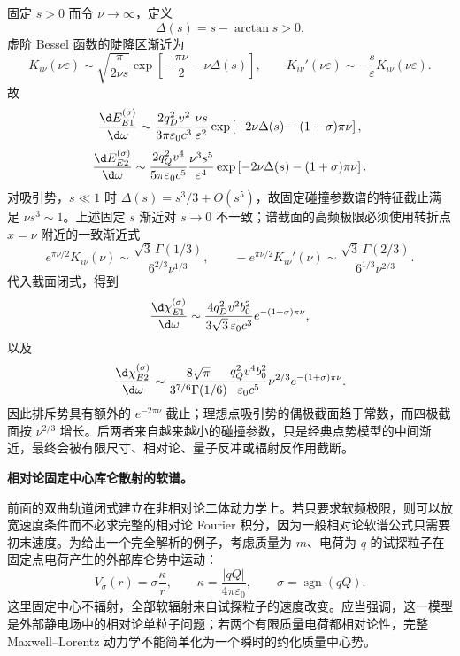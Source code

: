 固定 $s>0$ 而令 $\nu\to\infty$，定义
\begin{equation*}
	\Delta(s)=s-\arctan s>0.
\end{equation*}
虚阶 Bessel 函数的陡降区渐近为
\begin{equation*}
	K_{i\nu}(\nu\varepsilon)
	\sim\sqrt{\frac{\pi}{2\nu s}}
	\exp\left[-\frac{\pi\nu}{2}-\nu\Delta(s)\right],
	\qquad
	K_{i\nu}'(\nu\varepsilon)
	\sim-\frac{s}{\varepsilon}K_{i\nu}(\nu\varepsilon).
\end{equation*}
故
\begin{equation*}
	\frac{\d E_{E1}^{(\sigma)}}{\d\omega}
	\sim
	\frac{2q_D^2v^2}{3\pi\varepsilon_0c^3}
	\frac{\nu s}{\varepsilon^2}
	\exp\left[-2\nu\Delta(s)-(1+\sigma)\pi\nu\right],
\end{equation*}
\begin{equation*}
	\frac{\d E_{E2}^{(\sigma)}}{\d\omega}
	\sim
	\frac{2q_Q^2v^4}{5\pi\varepsilon_0c^5}
	\frac{\nu^3s^5}{\varepsilon^4}
	\exp\left[-2\nu\Delta(s)-(1+\sigma)\pi\nu\right].
\end{equation*}
对吸引势，$s\ll1$ 时 $\Delta(s)=s^3/3+O(s^5)$，故固定碰撞参数谱的特征截止满足 $\nu s^3\sim1$。上述固定 $s$ 渐近对 $s\to0$ 不一致；谱截面的高频极限必须使用转折点 $x=\nu$ 附近的一致渐近式
\begin{equation*}
	e^{\pi\nu/2}K_{i\nu}(\nu)
	\sim\frac{\sqrt3\,\Gamma(1/3)}{6^{2/3}\nu^{1/3}},
	\qquad
	-e^{\pi\nu/2}K_{i\nu}'(\nu)
	\sim\frac{\sqrt3\,\Gamma(2/3)}{6^{1/3}\nu^{2/3}}.
\end{equation*}
代入截面闭式，得到
\begin{equation*}
	\frac{\d\chi_{E1}^{(\sigma)}}{\d\omega}
	\sim
	\frac{4q_D^2v^2b_0^2}{3\sqrt3\,\varepsilon_0c^3}
	e^{-(1+\sigma)\pi\nu},
\end{equation*}
以及
\begin{equation*}
	\frac{\d\chi_{E2}^{(\sigma)}}{\d\omega}
	\sim
	\frac{8\sqrt\pi}{3^{7/6}\Gamma(1/6)}
	\frac{q_Q^2v^4b_0^2}{\varepsilon_0c^5}
	\nu^{2/3}e^{-(1+\sigma)\pi\nu}.
\end{equation*}
因此排斥势具有额外的 $e^{-2\pi\nu}$ 截止；理想点吸引势的偶极截面趋于常数，而四极截面按 $\nu^{2/3}$ 增长。后两者来自越来越小的碰撞参数，只是经典点势模型的中间渐近，最终会被有限尺寸、相对论、量子反冲或辐射反作用截断。

\textbf{相对论固定中心库仑散射的软谱。}

前面的双曲轨道闭式建立在非相对论二体动力学上。若只要求软频极限，则可以放宽速度条件而不必求完整的相对论 Fourier 积分，因为一般相对论软谱公式只需要初末速度。为给出一个完全解析的例子，考虑质量为 $m$、电荷为 $q$ 的试探粒子在固定点电荷产生的外部库仑势中运动：
\begin{equation*}
	V_\sigma(r)=\sigma\frac{\kappa}{r},
	\qquad
	\kappa=\frac{|qQ|}{4\pi\varepsilon_0},
	\qquad
	\sigma=\operatorname{sgn}(qQ).
\end{equation*}
这里固定中心不辐射，全部软辐射来自试探粒子的速度改变。应当强调，这一模型是外部静电场中的相对论单粒子问题；若两个有限质量电荷都相对论性，完整 Maxwell--Lorentz 动力学不能简单化为一个瞬时的约化质量中心势。

